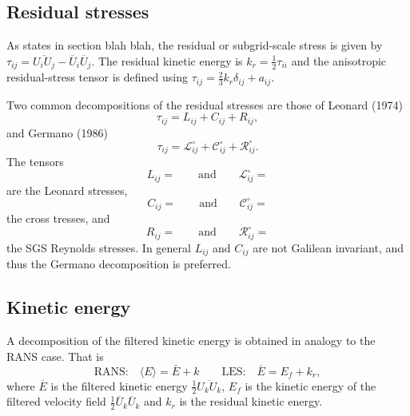 \documentclass[oneside,a4paper,11pt]{report}
\newcommand{\rs}{\tau}          %
\newcommand{\ars}{a}            %
\newcommand{\ures}{\overline{U}}
\begin{document}
\subsection{Residual stresses}
As states in section blah blah, the residual or subgrid-scale stress is given by $\rs_{ij} = \overline{ U_i U_j} - \ures_i \ures_j$. The residual kinetic energy is $k_r = \frac{1}{2} \rs_{ii}$ and the anisotropic residual-stress tensor is defined using $\rs_{ij} = \frac{2}{3} k_r \delta_{ij} + \ars_{ij}$.

Two common decompositions of the residual stresses are those of Leonard (1974)
\begin{equation}
\rs_{ij} = L_{ij} + C_{ij} + R_{ij},
\end{equation}
and Germano (1986)
\begin{equation}
\rs_{ij} = \mathcal{L}^\circ_{ij} + \mathcal{C}^\circ_{ij} + \mathcal{R}^\circ_{ij}.
\end{equation}
The tensors 
\begin{equation}
L_{ij} = \qquad \text{and} \qquad \mathcal{L}^\circ_{ij} = 
\end{equation}
are the Leonard stresses, 
\begin{equation}
C_{ij} = \qquad \text{and} \qquad \mathcal{C}^\circ_{ij} = 
\end{equation}
the cross tresses, and 
\begin{equation}
R_{ij} = \qquad \text{and} \qquad \mathcal{R}^\circ_{ij} = 
\end{equation}
the SGS Reynolds stresses. In general $L_{ij}$ and $C_{ij}$ are not Galilean invariant, and thus the Germano decomposition is preferred.

\subsection{Kinetic energy}
A decomposition of the filtered kinetic energy is obtained in analogy to the RANS case. That is
\begin{equation}
\text{RANS:}\quad \langle E \rangle = \bar{E} + k \qquad \text{LES:} \quad \overline{E} = E_f + k_r,
\end{equation}
where $\overline{E}$ is the filtered kinetic energy $\frac{1}{2} \overline{ U_k U_k}$, $E_f$ is the kinetic energy of the filtered velocity field $\frac{1}{2} \ures_k \ures_k$ and $k_r$ is the residual kinetic energy.
\end{document}
